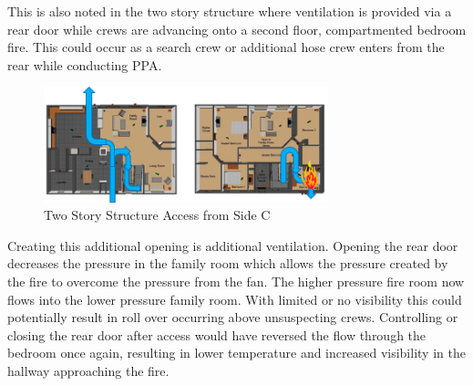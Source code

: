 \documentclass{article}
\begin{document}
This is also noted in the two story structure where ventilation is provided via a rear door while crews are advancing onto a second floor, compartmented bedroom fire. This could occur as a search crew or additional hose crew enters from the rear while conducting PPA. 

\begin{figure} [H]
	\centering
	\includegraphics[width = 3.25in]{0_Images/Tactical_Considerations/Additional_Vent/TwoStoryKitchenVent.png}
	\caption{Two Story Structure Access from Side C}
	\label{fig:AdditionalVents_TwoStoryConfig}
\end{figure}

Creating this additional opening is additional ventilation. Opening the rear door decreases the pressure in the family room which allows the pressure created by the fire to overcome the pressure from the fan. The higher pressure fire room now flows into the lower pressure family room. With limited or no visibility this could potentially result in roll over occurring above unsuspecting crews. Controlling or closing the rear door after access would have reversed the flow through the bedroom once again, resulting in lower temperature and increased visibility in the hallway approaching the fire. 
\end{document}
